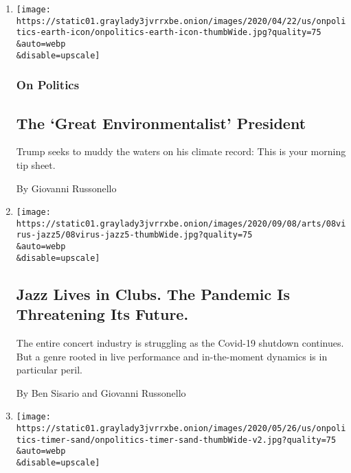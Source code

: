 \begin{enumerate}
\def\labelenumi{\arabic{enumi}.}
\item
  \href{/2020/09/09/us/politics/trump-climate-florida.html}{}

  \texttt{[image: https://static01.graylady3jvrrxbe.onion/images/2020/04/22/us/onpolitics-earth-icon/onpolitics-earth-icon-thumbWide.jpg?quality=75\\\&auto=webp\\\&disable=upscale]}

  \hypertarget{on-politics}{%
  \subsubsection{On Politics}\label{on-politics}}

  \hypertarget{the-great-environmentalist-president}{%
  \subsection{The `Great Environmentalist'
  President}\label{the-great-environmentalist-president}}

  Trump seeks to muddy the waters on his climate record: This is your
  morning tip sheet.

  By Giovanni Russonello
\item
  \href{/2020/09/08/arts/music/jazz-clubs-coronavirus.html}{}

  \texttt{[image: https://static01.graylady3jvrrxbe.onion/images/2020/09/08/arts/08virus-jazz5/08virus-jazz5-thumbWide.jpg?quality=75\\\&auto=webp\\\&disable=upscale]}

  \hypertarget{jazz-lives-in-clubs-the-pandemic-is-threatening-its-future}{%
  \subsection{Jazz Lives in Clubs. The Pandemic Is Threatening Its
  Future.}\label{jazz-lives-in-clubs-the-pandemic-is-threatening-its-future}}

  The entire concert industry is struggling as the Covid-19 shutdown
  continues. But a genre rooted in live performance and in-the-moment
  dynamics is in particular peril.

  By Ben Sisario and Giovanni Russonello
\item
  \href{/2020/09/08/us/politics/harris-pence-wisconsin.html}{}

  \texttt{[image: https://static01.graylady3jvrrxbe.onion/images/2020/05/26/us/onpolitics-timer-sand/onpolitics-timer-sand-thumbWide-v2.jpg?quality=75\\\&auto=webp\\\&disable=upscale]}


\end{enumerate}
